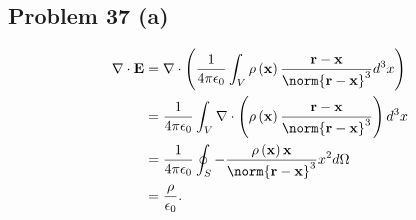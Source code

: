 \documentclass[10pt]{mypackage}
\begin{document}
\subsection{Problem 37 (a)}%
\begin{align*}
  \nabla \cdot \mathbf{E} &= \nabla \cdot \left(\frac{1}{4\pi\epsilon_0}\int_{V}\rho\left(\mathbf{x}\right) \frac{\mathbf{r} - \mathbf{x}}{\norm{\mathbf{r} - \mathbf{x}}^3}d^3x\right)\\
                          &= \frac{1}{4\pi\epsilon_0}\int_{V}\nabla \cdot \left(\rho\left(\mathbf{x}\right) \frac{\mathbf{r} - \mathbf{x}}{\norm{\mathbf{r} - \mathbf{x}}^3}\right)d^3 x\\
                          &= \frac{1}{4\pi\epsilon_0}\oint_{S} -\frac{\rho\left(\mathbf{x}\right)\mathbf{x}}{\norm{\mathbf{r} - \mathbf{x}}^3}x^2d\Omega\\
                          &= \frac{\rho}{\epsilon_0}.
\end{align*}
\end{document}
